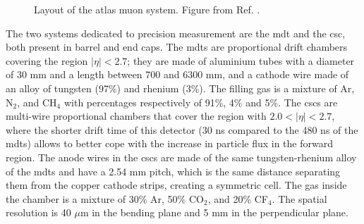 \begin{figure}[ht]
\centering
{}
\caption{Layout of the \gls{atlas} muon system. Figure from Ref. \cite{atlas:atlas}.}
\label{fig:atlas:muon}
\end{figure}

The two systems dedicated to precision measurement are the \gls{mdt} and the \gls{csc}, both present in barrel and end caps. The \glspl{mdt} are proportional drift chambers covering the region $|\eta|<2.7$; they are made of aluminium tubes with a diameter of 30 mm and a length between 700 and 6300 mm, and a cathode wire made of an alloy of tungsten (97\%) and rhenium (3\%). The filling gas is a mixture of Ar, N$_2$, and CH$_4$ with percentages respectively of 91\%, 4\% and 5\%. The \glspl{csc} are multi-wire proportional chambers that cover the region with $2.0<|\eta|<2.7$, where the shorter drift time of this detector (30 ns compared to the 480 ns of the \glspl{mdt}) allows to better cope with the increase in particle flux in the forward region. The anode wires in the \glspl{csc} are made of the same tungsten-rhenium alloy of the \glspl{mdt} and have a 2.54 mm pitch, which is the same distance separating them from the copper cathode strips, creating a symmetric cell. The gas inside the chamber is a mixture of 30\% Ar, 50\% CO$_2$, and 20\% CF$_4$. The spatial resolution is 40 $\mu$m in the bending plane and 5 mm in the perpendicular plane.

